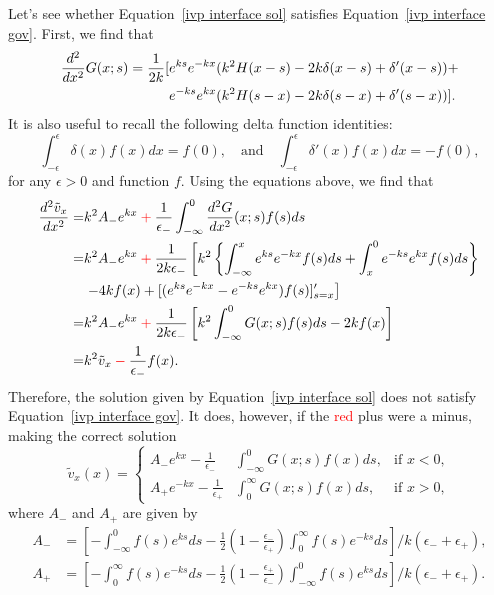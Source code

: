 Let's see whether Equation~\eqref{ivp interface sol} satisfies Equation~\eqref{ivp interface gov}. First, we find that
\begin{align}
\frac{d^2}{dx^2} G(x;s) = \frac{1}{2k}[& e^{ks}e^{-kx}(k^2H(x-s) - 2k\delta(x-s) + \delta'(x-s)) + \notag \\
& e^{-ks}e^{kx}(k^2H(s-x) - 2k\delta(s-x) + \delta'(s-x))].
\end{align}
It is also useful to recall the following delta function identities:
\begin{equation}
\int_{-\epsilon}^\epsilon \delta(x)f(x) dx = f(0), \quad \text{and} \quad \int_{-\epsilon}^\epsilon \delta'(x)f(x) dx = -f(0),
\end{equation}
for any $\epsilon > 0$ and function $f$. Using the equations above, we find that
\begin{align}
\frac{d^2\tilde{v}_x}{dx^2} = & k^2A_-e^{kx} \: \textcolor{red}{+} \: \frac{1}{\epsilon_-}\int_{-\infty}^0 \frac{d^2G}{dx^2}(x;s) f(s) ds \\
= & k^2A_-e^{kx} \: \textcolor{red}{+} \: \frac{1}{2k\epsilon_-}\left[k^2\left\{\int_{-\infty}^x e^{ks}e^{-kx}f(s) ds  + \int_x^0 e^{-ks}e^{kx}f(s) ds\right\} \right. \\
& \left.- 4kf(x) + [(e^{ks}e^{-kx}-e^{-ks}e^{kx})f(s)]'_{s=x} \right] \\
= & k^2A_-e^{kx} \: \textcolor{red}{+} \: \frac{1}{2k\epsilon_-}\left[k^2\int_{-\infty}^0 G(x;s)f(s) ds - 2kf(x) \right] \\
= & k^2\tilde{v}_x \: \textcolor{red}{-} \: \frac{1}{\epsilon_-}f(x).
\label{ivp interface error}
\end{align}
Therefore, the solution given by Equation~\eqref{ivp interface sol} does not satisfy Equation~\eqref{ivp interface gov}. It does, however, if the \textcolor{red}{red} plus were a minus, making the correct solution 
\begin{equation}
\tilde{v}_x(x) = \left\{
\begin{aligned}
A_-e^{kx} - \frac{1}{\epsilon_-} & \int_{-\infty}^{0} G(x;s)f(x)ds, & \text{if  } x<0,\\
A_+e^{-kx} - \frac{1}{\epsilon_+} & \int_{0}^{\infty} G(x;s)f(x)ds, & \text{if  } x>0,
\end{aligned}
\right.
\label{ivp interface sol correct}
\end{equation}
where $A_-$ and $A_+$ are given by
\begin{align}
A_- & = \left[- \int_{-\infty}^0 f(s)e^{ks} ds - \frac{1}{2}\left(1 - \frac{\epsilon_-}{\epsilon_+}\right)\int_0^\infty f(s)e^{-ks} ds\right] / k(\epsilon_- + \epsilon_+), \\
A_+ & = \left[-\int_0^\infty f(s)e^{-ks} ds - \frac{1}{2}\left(1 - \frac{\epsilon_+}{\epsilon_-}\right)\int_{-\infty}^0 f(s)e^{ks} ds\right] / k(\epsilon_- + \epsilon_+).
\end{align}